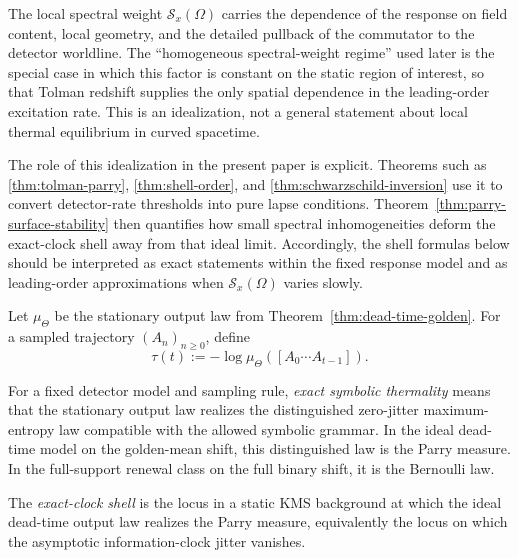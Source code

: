 \begin{remark}\label{rem:homogeneous-spectral-weight}
The local spectral weight $\mathcal S_x(\Omega)$ carries the dependence of the response on field content, local geometry, and the detailed pullback of the commutator to the detector worldline. The ``homogeneous spectral-weight regime'' used later is the special case in which this factor is constant on the static region of interest, so that Tolman redshift supplies the only spatial dependence in the leading-order excitation rate. This is an idealization, not a general statement about local thermal equilibrium in curved spacetime.

The role of this idealization in the present paper is explicit. Theorems such as \ref{thm:tolman-parry}, \ref{thm:shell-order}, and \ref{thm:schwarzschild-inversion} use it to convert detector-rate thresholds into pure lapse conditions. Theorem~\ref{thm:parry-surface-stability} then quantifies how small spectral inhomogeneities deform the exact-clock shell away from that ideal limit. Accordingly, the shell formulas below should be interpreted as exact statements within the fixed response model and as leading-order approximations when $\mathcal S_x(\Omega)$ varies slowly.
\end{remark}

\begin{definition}\label{def:bridge-cylinder-information}
Let $\mu_\Theta$ be the stationary output law from Theorem~\ref{thm:dead-time-golden}. For a sampled trajectory $(A_n)_{n\ge 0}$, define
\[
\tau(t):=-\log \mu_\Theta([A_0\cdots A_{t-1}]).
\]
\end{definition}

\begin{definition}\label{def:exact-symbolic-thermality}
For a fixed detector model and sampling rule, \emph{exact symbolic thermality} means that the stationary output law realizes the distinguished zero-jitter maximum-entropy law compatible with the allowed symbolic grammar. In the ideal dead-time model on the golden-mean shift, this distinguished law is the Parry measure. In the full-support renewal class on the full binary shift, it is the Bernoulli law.

The \emph{exact-clock shell} is the locus in a static KMS background at which the ideal dead-time output law realizes the Parry measure, equivalently the locus on which the asymptotic information-clock jitter vanishes.
\end{definition}

